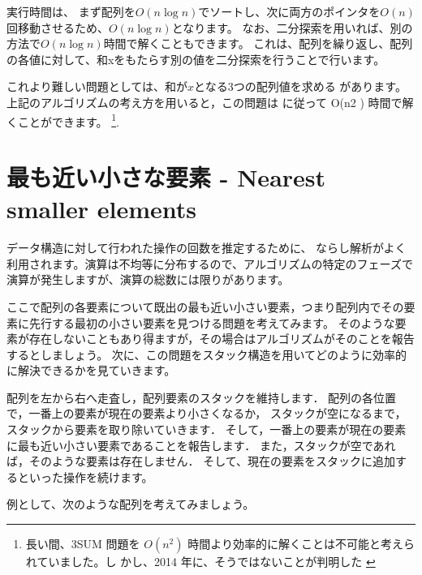 実行時間は、
まず配列を$O(n \log n)$でソートし、次に両方のポインタを$O(n)$回移動させるため、$O(n \log n)$となります。
なお、二分探索を用いれば、別の方法で$O(n \log n)$時間で解くこともできます。
これは、配列を繰り返し、配列の各値に対して、和xをもたらす別の値を二分探索を行うことで行います。

これより難しい問題としては、和が$x$となる3つの配列値を求める があります。
上記のアルゴリズムの考え方を用いると，この問題は に従って O(n2 ) 時間で解くことができます。
\footnote{長い間、3SUM 問題を $O(n^2)$ 時間より効率的に解くことは不可能と考えられていました。し
かし、2014 年に、そうではないことが判明した \cite{gro14} }.

\section{最も近い小さな要素 - Nearest smaller elements}


データ構造に対して行われた操作の回数を推定するために、
ならし解析がよく利用されます。演算は不均等に分布するので、アルゴリズムの特定のフェーズで演算が発生しますが、演算の総数には限りがあります。

ここで配列の各要素について既出の最も近い小さい要素，つまり配列内でその要素に先行する最初の小さい要素を見つける問題を考えてみます。
そのような要素が存在しないこともあり得ますが，その場合はアルゴリズムがそのことを報告するとしましょう。
次に、この問題をスタック構造を用いてどのように効率的に解決できるかを見ていきます。

配列を左から右へ走査し，配列要素のスタックを維持します．
配列の各位置で，一番上の要素が現在の要素より小さくなるか，
スタックが空になるまで，スタックから要素を取り除いていきます．
そして，一番上の要素が現在の要素に最も近い小さい要素であることを報告します．
また，スタックが空であれば，そのような要素は存在しません．
そして、現在の要素をスタックに追加するといった操作を続けます。

例として、次のような配列を考えてみましょう。

\begin{center}
\end{center}

